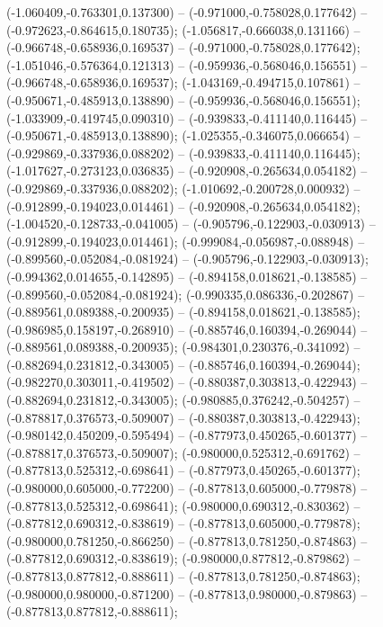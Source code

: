  (-1.060409,-0.763301,0.137300) -- (-0.971000,-0.758028,0.177642) -- (-0.972623,-0.864615,0.180735);
 (-1.056817,-0.666038,0.131166) -- (-0.966748,-0.658936,0.169537) -- (-0.971000,-0.758028,0.177642);
 (-1.051046,-0.576364,0.121313) -- (-0.959936,-0.568046,0.156551) -- (-0.966748,-0.658936,0.169537);
 (-1.043169,-0.494715,0.107861) -- (-0.950671,-0.485913,0.138890) -- (-0.959936,-0.568046,0.156551);
 (-1.033909,-0.419745,0.090310) -- (-0.939833,-0.411140,0.116445) -- (-0.950671,-0.485913,0.138890);
 (-1.025355,-0.346075,0.066654) -- (-0.929869,-0.337936,0.088202) -- (-0.939833,-0.411140,0.116445);
 (-1.017627,-0.273123,0.036835) -- (-0.920908,-0.265634,0.054182) -- (-0.929869,-0.337936,0.088202);
 (-1.010692,-0.200728,0.000932) -- (-0.912899,-0.194023,0.014461) -- (-0.920908,-0.265634,0.054182);
 (-1.004520,-0.128733,-0.041005) -- (-0.905796,-0.122903,-0.030913) -- (-0.912899,-0.194023,0.014461);
 (-0.999084,-0.056987,-0.088948) -- (-0.899560,-0.052084,-0.081924) -- (-0.905796,-0.122903,-0.030913);
 (-0.994362,0.014655,-0.142895) -- (-0.894158,0.018621,-0.138585) -- (-0.899560,-0.052084,-0.081924);
 (-0.990335,0.086336,-0.202867) -- (-0.889561,0.089388,-0.200935) -- (-0.894158,0.018621,-0.138585);
 (-0.986985,0.158197,-0.268910) -- (-0.885746,0.160394,-0.269044) -- (-0.889561,0.089388,-0.200935);
 (-0.984301,0.230376,-0.341092) -- (-0.882694,0.231812,-0.343005) -- (-0.885746,0.160394,-0.269044);
 (-0.982270,0.303011,-0.419502) -- (-0.880387,0.303813,-0.422943) -- (-0.882694,0.231812,-0.343005);
 (-0.980885,0.376242,-0.504257) -- (-0.878817,0.376573,-0.509007) -- (-0.880387,0.303813,-0.422943);
 (-0.980142,0.450209,-0.595494) -- (-0.877973,0.450265,-0.601377) -- (-0.878817,0.376573,-0.509007);
 (-0.980000,0.525312,-0.691762) -- (-0.877813,0.525312,-0.698641) -- (-0.877973,0.450265,-0.601377);
 (-0.980000,0.605000,-0.772200) -- (-0.877813,0.605000,-0.779878) -- (-0.877813,0.525312,-0.698641);
 (-0.980000,0.690312,-0.830362) -- (-0.877812,0.690312,-0.838619) -- (-0.877813,0.605000,-0.779878);
 (-0.980000,0.781250,-0.866250) -- (-0.877813,0.781250,-0.874863) -- (-0.877812,0.690312,-0.838619);
 (-0.980000,0.877812,-0.879862) -- (-0.877813,0.877812,-0.888611) -- (-0.877813,0.781250,-0.874863);
 (-0.980000,0.980000,-0.871200) -- (-0.877813,0.980000,-0.879863) -- (-0.877813,0.877812,-0.888611);
